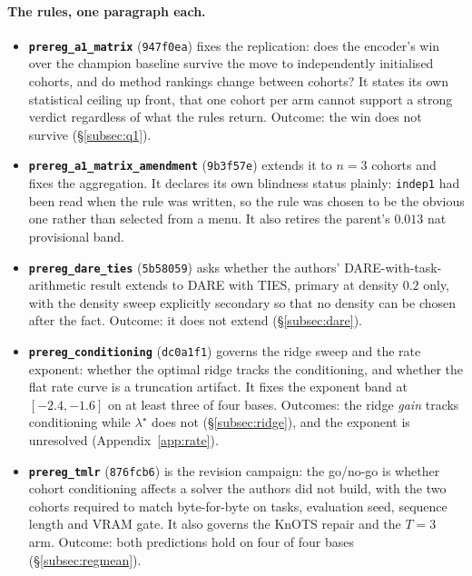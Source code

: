\paragraph{The rules, one paragraph each.}
\begin{itemize}\itemsep2pt
\item \textbf{\texttt{prereg\_a1\_matrix}} (\texttt{947f0ea}) fixes the
replication: does the encoder's win over the champion baseline survive the
move to independently initialised cohorts, and do method rankings change
between cohorts? It states its own statistical ceiling up front, that one
cohort per arm cannot support a strong verdict regardless of what the rules
return. Outcome: the win does not survive (\S\ref{subsec:q1}).

\item \textbf{\texttt{prereg\_a1\_matrix\_amendment}} (\texttt{9b3f57e})
extends it to $n = 3$ cohorts and fixes the aggregation. It declares its
own blindness status plainly: \texttt{indep1} had been read when the rule
was written, so the rule was chosen to be the obvious one rather than
selected from a menu. It also retires the parent's $0.013$ nat provisional
band.

\item \textbf{\texttt{prereg\_dare\_ties}} (\texttt{5b58059}) asks whether
the authors' DARE-with-task-arithmetic result extends to DARE with TIES, primary at
density $0.2$ only, with the density sweep explicitly secondary so that no
density can be chosen after the fact. Outcome: it does not extend
(\S\ref{subsec:dare}).

\item \textbf{\texttt{prereg\_conditioning}} (\texttt{dc0a1f1}) governs the
ridge sweep and the rate exponent: whether the optimal ridge tracks the
conditioning, and whether the flat rate curve is a truncation artifact. It
fixes the exponent band at $[-2.4, -1.6]$ on at least three of four bases.
Outcomes: the ridge \emph{gain} tracks conditioning while $\lambda^\star$
does not (\S\ref{subsec:ridge}), and the exponent is unresolved
(Appendix~\ref{app:rate}).

\item \textbf{\texttt{prereg\_tmlr}} (\texttt{876fcb6}) is the revision
campaign: the go/no-go is whether cohort conditioning affects a solver the authors
did not build, with the two cohorts required to match byte-for-byte on
tasks, evaluation seed, sequence length and VRAM gate. It also governs the
KnOTS repair and the $T = 3$ arm. Outcome: both predictions hold on four of
four bases (\S\ref{subsec:regmean}).


\end{itemize}
